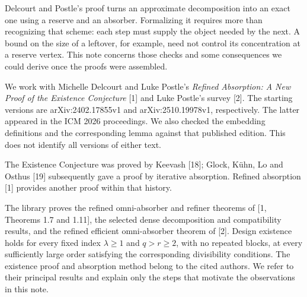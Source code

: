 \documentclass[english,11pt,a4paper]{article}
\begin{document}
Delcourt and Postle's proof turns an approximate decomposition into an exact one using a reserve and an absorber. Formalizing it requires more than recognizing that scheme: each step must supply the object needed by the next. A bound on the size of a leftover, for example, need not control its concentration at a reserve vertex. This note concerns those checks and some consequences we could derive once the proofs were assembled.

We work with Michelle Delcourt and Luke Postle's \emph{Refined Absorption: A New Proof of the Existence Conjecture} {[}1{]} and Luke Postle's survey {[}2{]}. The starting versions are arXiv:2402.17855v1 and arXiv:2510.19978v1, respectively. The latter appeared in the ICM 2026 proceedings. We also checked the embedding definitions and the corresponding lemma against that published edition. This does not identify all versions of either text.

The Existence Conjecture was proved by Keevash {[}18{]}; Glock, Kühn, Lo and Osthus {[}19{]} subsequently gave a proof by iterative absorption. Refined absorption {[}1{]} provides another proof within that history.

The library proves the refined omni-absorber and refiner theorems of {[}1, Theorems 1.7 and 1.11{]}, the selected dense decomposition and compatibility results, and the refined efficient omni-absorber theorem of {[}2{]}. Design existence holds for every fixed index \(\lambda\ge1\) and \(q>r\ge2\), with no repeated blocks, at every sufficiently large order satisfying the corresponding divisibility conditions. The existence proof and absorption method belong to the cited authors. We refer to their principal results and explain only the steps that motivate the observations in this note.
\end{document}
